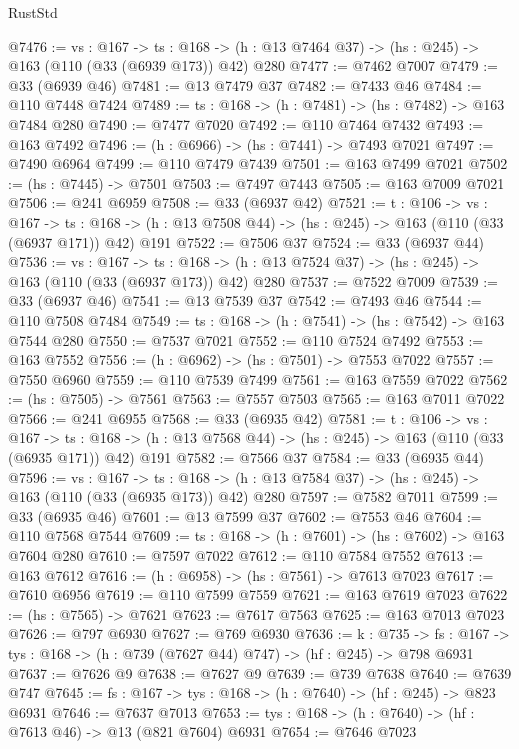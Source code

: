 \begin{lexlean}{RustStd}
\begin{coremodule}
@7476 := {vs : @167} ->
  {ts : @168} -> (h : @13 @7464 @37) -> (hs : @245) -> @163 (@110 (@33 (@6939 @173)) @42) @280
@7477 := @7462 @7007
@7479 := @33 (@6939 @46)
@7481 := @13 @7479 @37
@7482 := @7433 @46
@7484 := @110 @7448 @7424
@7489 := {ts : @168} -> (h : @7481) -> (hs : @7482) -> @163 @7484 @280
@7490 := @7477 @7020
@7492 := @110 @7464 @7432
@7493 := @163 @7492
@7496 := (h : @6966) -> (hs : @7441) -> @7493 @7021
@7497 := @7490 @6964
@7499 := @110 @7479 @7439
@7501 := @163 @7499 @7021
@7502 := (hs : @7445) -> @7501
@7503 := @7497 @7443
@7505 := @163 @7009 @7021
@7506 := @241 @6959
@7508 := @33 (@6937 @42)
@7521 := {t : @106} ->
  {vs : @167} ->
  {ts : @168} -> (h : @13 @7508 @44) -> (hs : @245) -> @163 (@110 (@33 (@6937 @171)) @42) @191
@7522 := @7506 @37
@7524 := @33 (@6937 @44)
@7536 := {vs : @167} ->
  {ts : @168} -> (h : @13 @7524 @37) -> (hs : @245) -> @163 (@110 (@33 (@6937 @173)) @42) @280
@7537 := @7522 @7009
@7539 := @33 (@6937 @46)
@7541 := @13 @7539 @37
@7542 := @7493 @46
@7544 := @110 @7508 @7484
@7549 := {ts : @168} -> (h : @7541) -> (hs : @7542) -> @163 @7544 @280
@7550 := @7537 @7021
@7552 := @110 @7524 @7492
@7553 := @163 @7552
@7556 := (h : @6962) -> (hs : @7501) -> @7553 @7022
@7557 := @7550 @6960
@7559 := @110 @7539 @7499
@7561 := @163 @7559 @7022
@7562 := (hs : @7505) -> @7561
@7563 := @7557 @7503
@7565 := @163 @7011 @7022
@7566 := @241 @6955
@7568 := @33 (@6935 @42)
@7581 := {t : @106} ->
  {vs : @167} ->
  {ts : @168} -> (h : @13 @7568 @44) -> (hs : @245) -> @163 (@110 (@33 (@6935 @171)) @42) @191
@7582 := @7566 @37
@7584 := @33 (@6935 @44)
@7596 := {vs : @167} ->
  {ts : @168} -> (h : @13 @7584 @37) -> (hs : @245) -> @163 (@110 (@33 (@6935 @173)) @42) @280
@7597 := @7582 @7011
@7599 := @33 (@6935 @46)
@7601 := @13 @7599 @37
@7602 := @7553 @46
@7604 := @110 @7568 @7544
@7609 := {ts : @168} -> (h : @7601) -> (hs : @7602) -> @163 @7604 @280
@7610 := @7597 @7022
@7612 := @110 @7584 @7552
@7613 := @163 @7612
@7616 := (h : @6958) -> (hs : @7561) -> @7613 @7023
@7617 := @7610 @6956
@7619 := @110 @7599 @7559
@7621 := @163 @7619 @7023
@7622 := (hs : @7565) -> @7621
@7623 := @7617 @7563
@7625 := @163 @7013 @7023
@7626 := @797 @6930
@7627 := @769 @6930
@7636 := {k : @735} ->
  {fs : @167} -> {tys : @168} -> (h : @739 (@7627 @44) @747) -> (hf : @245) -> @798 @6931
@7637 := @7626 @9
@7638 := @7627 @9
@7639 := @739 @7638
@7640 := @7639 @747
@7645 := {fs : @167} -> {tys : @168} -> (h : @7640) -> (hf : @245) -> @823 @6931
@7646 := @7637 @7013
@7653 := {tys : @168} -> (h : @7640) -> (hf : @7613 @46) -> @13 (@821 @7604) @6931
@7654 := @7646 @7023

\end{coremodule}
\end{lexlean}

